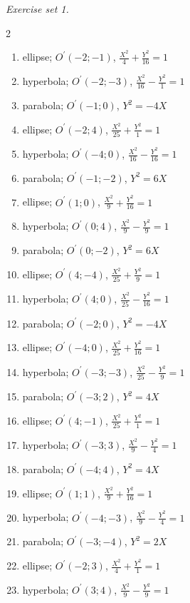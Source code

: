 \par\noindent\emph{Exercise set 1.}\nopagebreak
\begin{multicols}{2}\raggedright
\begin{enumerate}[label=\arabic*., leftmargin=*, itemsep=1pt]
\item ellipse; $O^{\prime}(-2;-1)$, $\frac{X^2}{4}+\frac{Y^2}{16}=1$
\item hyperbola; $O^{\prime}(-2;-3)$, $\frac{X^2}{16}-\frac{Y^2}{1}=1$
\item parabola; $O^{\prime}(-1;0)$, $Y^2=-4X$
\item ellipse; $O^{\prime}(-2;4)$, $\frac{X^2}{25}+\frac{Y^2}{1}=1$
\item hyperbola; $O^{\prime}(-4;0)$, $\frac{X^2}{16}-\frac{Y^2}{16}=1$
\item parabola; $O^{\prime}(-1;-2)$, $Y^2=6X$
\item ellipse; $O^{\prime}(1;0)$, $\frac{X^2}{9}+\frac{Y^2}{16}=1$
\item hyperbola; $O^{\prime}(0;4)$, $\frac{X^2}{9}-\frac{Y^2}{9}=1$
\item parabola; $O^{\prime}(0;-2)$, $Y^2=6X$
\item ellipse; $O^{\prime}(4;-4)$, $\frac{X^2}{25}+\frac{Y^2}{9}=1$
\item hyperbola; $O^{\prime}(4;0)$, $\frac{X^2}{25}-\frac{Y^2}{16}=1$
\item parabola; $O^{\prime}(-2;0)$, $Y^2=-4X$
\item ellipse; $O^{\prime}(-4;0)$, $\frac{X^2}{25}+\frac{Y^2}{16}=1$
\item hyperbola; $O^{\prime}(-3;-3)$, $\frac{X^2}{25}-\frac{Y^2}{9}=1$
\item parabola; $O^{\prime}(-3;2)$, $Y^2=4X$
\item ellipse; $O^{\prime}(4;-1)$, $\frac{X^2}{25}+\frac{Y^2}{1}=1$
\item hyperbola; $O^{\prime}(-3;3)$, $\frac{X^2}{9}-\frac{Y^2}{4}=1$
\item parabola; $O^{\prime}(-4;4)$, $Y^2=4X$
\item ellipse; $O^{\prime}(1;1)$, $\frac{X^2}{9}+\frac{Y^2}{16}=1$
\item hyperbola; $O^{\prime}(-4;-3)$, $\frac{X^2}{9}-\frac{Y^2}{4}=1$
\item parabola; $O^{\prime}(-3;-4)$, $Y^2=2X$
\item ellipse; $O^{\prime}(-2;3)$, $\frac{X^2}{4}+\frac{Y^2}{1}=1$
\item hyperbola; $O^{\prime}(3;4)$, $\frac{X^2}{9}-\frac{Y^2}{9}=1$

\end{enumerate}
\end{multicols}
